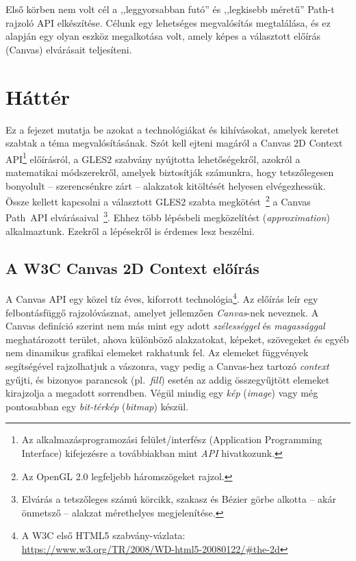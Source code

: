 \documentclass[12pt]{report}
\theoremstyle{definition}
\newcommand{\inenglish}[1]{\textsl{#1}}
\begin{document}
Első körben nem volt cél a ,,leggyorsabban futó'' és ,,legkisebb méretű''
Path-t rajzoló API elkészítése. Célunk egy lehetséges megvalósítás megtalálása,
és ez alapján egy olyan eszköz megalkotása volt, amely képes a választott
előírás (Canvas) elvárásait teljesíteni.



    \chapter{Háttér}
    \label{Háttér}

Ez a fejezet mutatja be azokat a technológiákat és kihívásokat, amelyek keretet
szabtak a téma megvalósításának. Szót kell ejteni magáról a Canvas 2D Context
API\footnote{Az alkalmazásprogramozási felület/interfész (Application
Programming Interface) kifejezésre a továbbiakban mint \emph{API} hivatkozunk.}
előírásról, a GLES2 szabvány nyújtotta lehetőségekről, azokról a matematikai
módszerekről, amelyek biztosítják számunkra, hogy tetszőlegesen bonyolult --
szerencsénkre zárt -- alakzatok kitöltését helyesen elvégezhessük. Össze
kellett kapcsolni a választott GLES2 szabta megkötést~\footnote { Az OpenGL 2.0
legfeljebb háromszögeket rajzol. } a Canvas Path~API elvárásaival~\footnote {
Elvárás a tetszőleges számú körcikk, szakasz és Bézier görbe alkotta -- akár
önmetsző -- alakzat mérethelyes megjelenítése. }. Ehhez több lépésbeli
megközelítést (\inenglish{approximation}) alkalmaztunk. Ezekről a lépésekről is
érdemes lesz beszélni.

    \section[A Canvas előírás]{A W3C Canvas 2D Context előírás}
    \label{A Canvas előírás}

A Canvas API egy közel tíz éves, kiforrott technológia\footnote {A W3C első
HTML5 szabvány-vázlata:\\ \footnotesize{
\url{https://www.w3.org/TR/2008/WD-html5-20080122/\#the-2d}} }. Az előírás leír
egy felbontásfüggő rajzolóvásznat, amelyet jellemzően \emph{Canvas}-nek
neveznek. A Canvas definíció szerint nem más mint egy adott \emph{szélességgel}
és \emph{magassággal} meghatározott terület, ahova különböző alakzatokat,
képeket, szövegeket és egyéb nem dinamikus grafikai elemeket rakhatunk fel. Az
elemeket függvények segítségével rajzolhatjuk a vászonra, vagy pedig a
Canvas-hez tartozó \emph{context} gyűjti, és bizonyos parancsok
(pl.~\emph{fill}) esetén az addig összegyűjtött elemeket kirajzolja a megadott
sorrendben. Végül mindig egy \emph{kép} (\inenglish{image}) vagy még
pontosabban egy \emph{bit-térkép} (\inenglish{bitmap}) készül.
\end{document}
